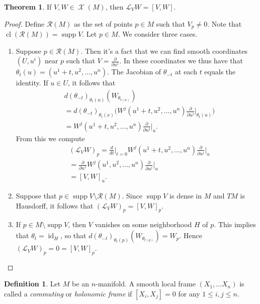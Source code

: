 \documentclass[10pt,letterpaper,cm]{nupset}
\theoremstyle{definition}
\newtheorem*{definition}{Definition}
\newtheorem{theorem}{Theorem}
\newcommand{\1}{\mathbf{1}}
\newcommand{\0}{\vec 0}
\DeclareMathOperator{\id}{id}
\DeclareMathOperator{\supp}{supp}
\DeclareMathOperator{\cl}{cl}
\DeclareMathOperator{\vf}{\mathscr{X}}
\begin{document}
\begin{theorem}
If $V, W\in \vf(M)$, then $\mathcal{L}_VW = [V, W]$.
\end{theorem}
\begin{proof}
Define $\mathcal{R}(M)$ as the set of points $p\in M$ such that $V_p\ne 0$. Note that $\cl(\mathcal{R}(M)) = \supp V$. Let $p\in M$. We consider three cases.
\begin{enumerate}
\item Suppose $p\in \mathcal{R}(M)$. Then it's a fact that we can find smooth coordinates $(U, u^i)$ near $p$ such that $V= \frac{\partial}{\partial{u^1}}$. In these coordinates we thus have that $\theta_t(u) = (u^1 +t, u^2, \ldots, u^n)$. The Jacobian of ${\theta_{-t}}$ at each $t$ equals the identity. If $u\in U$, it follows that
\begin{align*}
& d(\theta_{-t})_{\theta_t(u)}(W_{\theta_{t(u)}})
\\ & = d(\theta_{-t})_{\theta_t(x)} \big(W^j(u^1 + t, u^2, \ldots, u^n)\frac{\partial}{\partial{u^j}}\rvert_{\theta_t(u)}\big )
\\ & = W^j(u^1 + t, u^2, \ldots, u^n)\frac{\partial}{\partial{u^j}}\rvert_{u}.
\end{align*}
From this we compute
\begin{align*}
& (\mathcal{L}_VW)_p= \frac{d}{dt}\rvert_{t=0} W^j(u^1 + t, u^2, \ldots, u^n)\frac{\partial}{\partial{u^j}}\rvert_{u}
\\ & = \frac{\partial}{\partial{u^1}}W^j(u^1 , u^2, \ldots, u^n)\frac{\partial}{\partial{u^j}}\rvert_{u}
\\ & = [V, W]_u
.\end{align*}
\item Suppose that $p\in \supp V \setminus \mathcal{R}(M)$. Since $\supp V$ is dense in $M$ and $TM$ is Hausdorff, it follows that $(\mathcal{L}_VW)_p = [V, W]_p$.
\item If $p\in  M\setminus \supp V$, then $V$ vanishes on some neighborhood $H$ of $p$. This implies that $\theta_t = \id_H$, so that $d(\theta_{-t})_{\theta_t(p)}(W_{\theta_{t(p)}}) = W_p$. Hence $(\mathcal{L}_VW)_p =0 = [V, W]_p$.
\end{enumerate}
\end{proof}

\begin{definition}
Let $M$ be an $n$-manifold. A smooth local frame $(X_1, \ldots X_n)$ is called a \textit{commuting} or \textit{holonomic frame} if $[X_i, X_j]=0$ for any $1\leq i,j\leq n$.
\end{definition}
\end{document}
